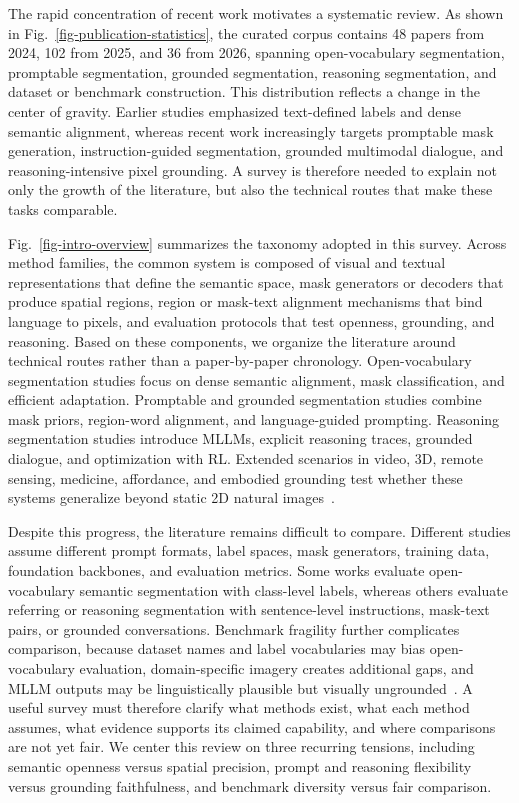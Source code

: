The rapid concentration of recent work motivates a systematic review. As shown in Fig.~\ref{fig-publication-statistics}, the curated corpus contains 48 papers from 2024, 102 from 2025, and 36 from 2026, spanning open-vocabulary segmentation, promptable segmentation, grounded segmentation, reasoning segmentation, and dataset or benchmark construction. This distribution reflects a change in the center of gravity. Earlier studies emphasized text-defined labels and dense semantic alignment, whereas recent work increasingly targets promptable mask generation, instruction-guided segmentation, grounded multimodal dialogue, and reasoning-intensive pixel grounding. A survey is therefore needed to explain not only the growth of the literature, but also the technical routes that make these tasks comparable.

Fig.~\ref{fig-intro-overview} summarizes the taxonomy adopted in this survey. Across method families, the common system is composed of visual and textual representations that define the semantic space, mask generators or decoders that produce spatial regions, region or mask-text alignment mechanisms that bind language to pixels, and evaluation protocols that test openness, grounding, and reasoning. Based on these components, we organize the literature around technical routes rather than a paper-by-paper chronology. Open-vocabulary segmentation studies focus on dense semantic alignment, mask classification, and efficient adaptation. Promptable and grounded segmentation studies combine mask priors, region-word alignment, and language-guided prompting. Reasoning segmentation studies introduce MLLMs, explicit reasoning traces, grounded dialogue, and optimization with RL. Extended scenarios in video, 3D, remote sensing, medicine, affordance, and embodied grounding test whether these systems generalize beyond static 2D natural images~\citep{xuVideosegr1ReasoningVideo2026,chen3DDRESDetailed3D2026,libExploringEfficientOpenvocabulary2026,yanMedreasonerReinforcementLearning2026,wangAffordancer1ReinforcementLearning2026}.

Despite this progress, the literature remains difficult to compare. Different studies assume different prompt formats, label spaces, mask generators, training data, foundation backbones, and evaluation metrics. Some works evaluate open-vocabulary semantic segmentation with class-level labels, whereas others evaluate referring or reasoning segmentation with sentence-level instructions, mask-text pairs, or grounded conversations. Benchmark fragility further complicates comparison, because dataset names and label vocabularies may bias open-vocabulary evaluation, domain-specific imagery creates additional gaps, and MLLM outputs may be linguistically plausible but visually ungrounded~\citep{hhuangRenovatingNamesOpenvocabulary2024,libExploringEfficientOpenvocabulary2026,guoSeeingBelievingRichContext2026}. A useful survey must therefore clarify what methods exist, what each method assumes, what evidence supports its claimed capability, and where comparisons are not yet fair. We center this review on three recurring tensions, including semantic openness versus spatial precision, prompt and reasoning flexibility versus grounding faithfulness, and benchmark diversity versus fair comparison.

